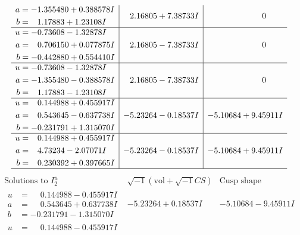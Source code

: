 \documentclass[1p]{elsarticle_modified}
\theoremstyle{definition}
\newcommand{\I}{\sqrt{-1}}
\begin{document}
$$\begin{array}{c|c|c}
\begin{aligned}
a &= -1.355480 + 0.388578 I \\
b &= \phantom{-}1.17883 + 1.23108 I\end{aligned}
 & \phantom{-}2.16805 + 7.38733 I & \phantom{-0.000000 } 0 \\ \hline\begin{aligned}
u &= -0.73608 - 1.32878 I \\
a &= \phantom{-}0.706150 + 0.077875 I \\
b &= -0.442880 + 0.554410 I\end{aligned}
 & \phantom{-}2.16805 - 7.38733 I & \phantom{-0.000000 } 0 \\ \hline\begin{aligned}
u &= -0.73608 - 1.32878 I \\
a &= -1.355480 - 0.388578 I \\
b &= \phantom{-}1.17883 - 1.23108 I\end{aligned}
 & \phantom{-}2.16805 - 7.38733 I & \phantom{-0.000000 } 0 \\ \hline\begin{aligned}
u &= \phantom{-}0.144988 + 0.455917 I \\
a &= \phantom{-}0.543645 - 0.637738 I \\
b &= -0.231791 + 1.315070 I\end{aligned}
 & -5.23264 - 0.18537 I & -5.10684 + 9.45911 I \\ \hline\begin{aligned}
u &= \phantom{-}0.144988 + 0.455917 I \\
a &= \phantom{-}4.73234 - 2.07071 I \\
b &= \phantom{-}0.230392 + 0.397665 I\end{aligned}
 & -5.23264 - 0.18537 I & -5.10684 + 9.45911 I\\
 \hline 
 \end{array}$$\newpage$$\begin{array}{c|c|c}  
\text{Solutions to }I^u_{2}& \I (\text{vol} + \sqrt{-1}CS) & \text{Cusp shape}\\
 \hline 
\begin{aligned}
u &= \phantom{-}0.144988 - 0.455917 I \\
a &= \phantom{-}0.543645 + 0.637738 I \\
b &= -0.231791 - 1.315070 I\end{aligned}
 & -5.23264 + 0.18537 I & -5.10684 - 9.45911 I \\ \hline\begin{aligned}
u &= \phantom{-}0.144988 - 0.455917 I \\

\end{aligned}
\end{array}$$
\end{document}
